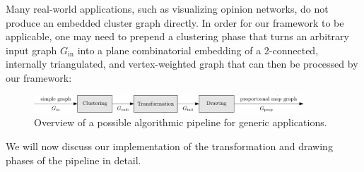 Many real-world applications, such as visualizing opinion networks, do not produce an embedded cluster graph directly. In order for our framework to be applicable, one may need to prepend a clustering phase that turns an arbitrary input graph $G_\text{in}$ into a plane combinatorial embedding of a 2-connected, internally triangulated, and vertex-weighted graph that can then be processed by our framework:
%
\begin{figure}[H]
	\centering\includegraphics[width=0.9\textwidth]{Resources/Pipeline-Application-Static.pdf}
	\caption{Overview of a possible algorithmic pipeline for generic applications.}
	\label{fig:static-pipeline-application}
\end{figure}

We will now discuss our implementation of the transformation and drawing phases of the pipeline in detail.

\clearpage


\clearpage

